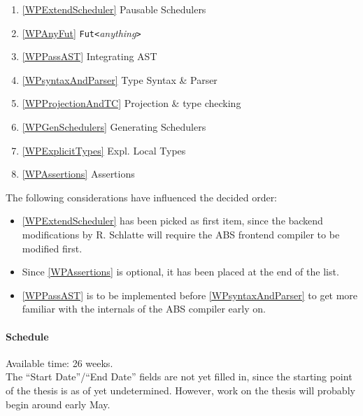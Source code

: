 \documentclass[paper=a4,nochapname,accentcolor=tud9c]{tudexercise}
\begin{document}
\begin{enumerate}[label=(\arabic*)]
  \item \label{orderExtendScheduler} \ref{WPExtendScheduler} Pausable Schedulers
  \item \label{orderAnyFut} \ref{WPAnyFut} \texttt{Fut<}\emph{anything}\texttt{>}
  \item \label{orderPassAST} \ref{WPPassAST} Integrating AST
  \item \label{ordersyntaxAndParser} \ref{WPsyntaxAndParser} Type Syntax \& Parser
  \item \label{orderProjectionAndTC} \ref{WPProjectionAndTC} Projection \& type checking
  \item \label{orderGenSchedulers} \ref{WPGenSchedulers} Generating Schedulers
  \item \label{orderExplicitTypes} \ref{WPExplicitTypes} Expl. Local Types
  \item \label{orderAssertions} \ref{WPAssertions} Assertions
\end{enumerate}

The following considerations have influenced the decided order:
\begin{itemize}
  \item \ref{WPExtendScheduler} has been picked as first item, since the
    backend modifications by R. Schlatte will require the ABS frontend compiler
    to be modified first.
  \item Since \ref{WPAssertions} is optional, it has been placed at the end of
    the list.
  \item \ref{WPPassAST} is to be implemented before \ref{WPsyntaxAndParser} to
    get more familiar with the internals of the ABS compiler early on.
\end{itemize}

\paragraph{Schedule}%
%
Available time: 26 weeks.
\\
The ``Start Date''/``End Date'' fields are not yet filled in, since the
starting point of the thesis is as of yet undetermined.
However, work on the thesis will probably begin around early May.

\medskip
\end{document}

